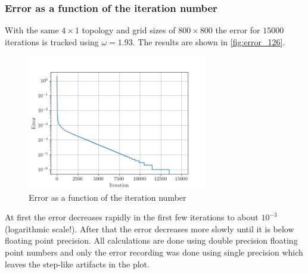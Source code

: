 \subsubsection{Error as a function of the iteration number}
With the same $4 \times 1$ topology and grid sizes of $800 \times 800$ the error for $15000$ iterations is tracked using $\omega = 1.93$. The results are shown in \autoref{fig:error_126}.
\begin{figure}[H]
    \centering
    \includegraphics[width=0.7\textwidth]{../fig/lab1/errors_126.png}
    \caption{Error as a function of the iteration number}
    \label{fig:error_126}
\end{figure}
At first the error decreases rapidly in the first few iterations to about $10^{-3}$ (logarithmic scale!). After that the error decreases more slowly until it is below floating point precision.  All calculations are done using double precision floating point numbers and only the error recording was done using single precision which leaves the step-like artifacts in the plot. 

